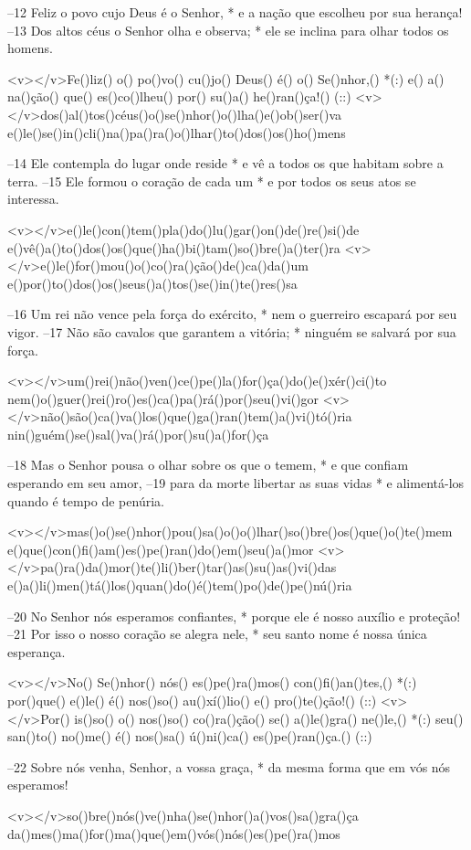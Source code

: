 –12 Feliz o povo cujo Deus é o Senhor, *
e a nação que escolheu por sua herança!
–13 Dos altos céus o Senhor olha e observa; *
ele se inclina para olhar todos os homens.

<v></v>Fe()liz() o() po()vo() cu()jo() Deus() é() o() Se()nhor,() *(:)
e() a() na()ção() que() es()co()lheu() por() su()a() he()ran()ça!() (::)
<v></v>dos()al()tos()céus()o()se()nhor()o()lha()e()ob()ser()va
e()le()se()in()cli()na()pa()ra()o()lhar()to()dos()os()ho()mens

–14 Ele contempla do lugar onde reside *
e vê a todos os que habitam sobre a terra.
–15 Ele formou o coração de cada um *
e por todos os seus atos se interessa.

<v></v>e()le()con()tem()pla()do()lu()gar()on()de()re()si()de
e()vê()a()to()dos()os()que()ha()bi()tam()so()bre()a()ter()ra
<v></v>e()le()for()mou()o()co()ra()ção()de()ca()da()um
e()por()to()dos()os()seus()a()tos()se()in()te()res()sa

–16 Um rei não vence pela força do exército, *
nem o guerreiro escapará por seu vigor.
–17 Não são cavalos que garantem a vitória; *
ninguém se salvará por sua força.

<v></v>um()rei()não()ven()ce()pe()la()for()ça()do()e()xér()ci()to
nem()o()guer()rei()ro()es()ca()pa()rá()por()seu()vi()gor
<v></v>não()são()ca()va()los()que()ga()ran()tem()a()vi()tó()ria
nin()guém()se()sal()va()rá()por()su()a()for()ça

–18 Mas o Senhor pousa o olhar sobre os que o temem, *
e que confiam esperando em seu amor,
–19 para da morte libertar as suas vidas *
e alimentá-los quando é tempo de penúria.

<v></v>mas()o()se()nhor()pou()sa()o()o()lhar()so()bre()os()que()o()te()mem
e()que()con()fi()am()es()pe()ran()do()em()seu()a()mor
<v></v>pa()ra()da()mor()te()li()ber()tar()as()su()as()vi()das
e()a()li()men()tá()los()quan()do()é()tem()po()de()pe()nú()ria

–20 No Senhor nós esperamos confiantes, *
porque ele é nosso auxílio e proteção!
–21 Por isso o nosso coração se alegra nele, *
seu santo nome é nossa única esperança.

<v></v>No() Se()nhor() nós() es()pe()ra()mos() con()fi()an()tes,() *(:)
por()que() e()le() é() nos()so() au()xí()lio() e() pro()te()ção!() (::)
<v></v>Por() is()so() o() nos()so() co()ra()ção() se() a()le()gra() ne()le,() *(:)
seu() san()to() no()me() é() nos()sa() ú()ni()ca() es()pe()ran()ça.() (::)

–22 Sobre nós venha, Senhor, a vossa graça, *
da mesma forma que em vós nós esperamos!

<v></v>so()bre()nós()ve()nha()se()nhor()a()vos()sa()gra()ça
da()mes()ma()for()ma()que()em()vós()nós()es()pe()ra()mos